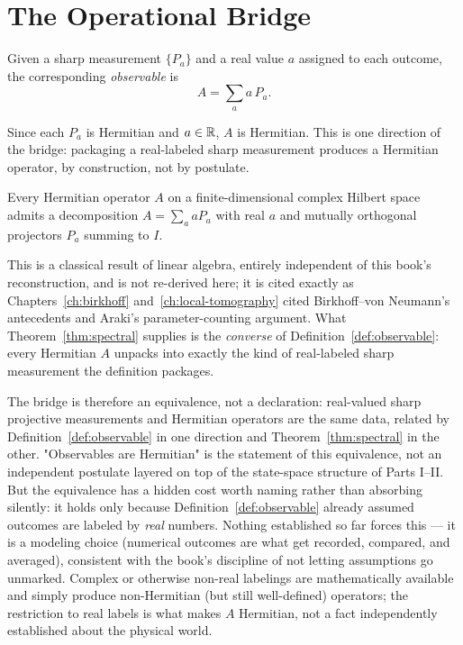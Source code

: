 \section{The Operational Bridge}

\begin{definition}[Observable]
\label{def:observable}
Given a sharp measurement $\{P_a\}$ and a real value $a$ assigned to each
outcome, the corresponding \emph{observable} is
\begin{equation}
A = \sum_a a\, P_a.
\end{equation}
\end{definition}

Since each $P_a$ is Hermitian and $a\in\mathbb{R}$, $A$ is Hermitian. This is one
direction of the bridge: packaging a real-labeled sharp measurement produces
a Hermitian operator, by construction, not by postulate.

\begin{theorem}
\label{thm:spectral}
Every Hermitian operator $A$ on a finite-dimensional complex Hilbert space
admits a decomposition $A = \sum_a a P_a$ with real $a$ and mutually
orthogonal projectors $P_a$ summing to $I$.
\end{theorem}

This is a classical result of linear algebra, entirely independent of this
book's reconstruction, and is not re-derived here; it is cited exactly as
Chapters~\ref{ch:birkhoff} and~\ref{ch:local-tomography} cited
Birkhoff--von Neumann's antecedents and Araki's parameter-counting argument.
What Theorem~\ref{thm:spectral} supplies is the \emph{converse} of
Definition~\ref{def:observable}: every Hermitian $A$ unpacks into exactly the
kind of real-labeled sharp measurement the definition packages.

\begin{remark}
\label{rem:real-labels-assumption}
The bridge is therefore an equivalence, not a declaration: real-valued sharp
projective measurements and Hermitian operators are the same data, related by
Definition~\ref{def:observable} in one direction and
Theorem~\ref{thm:spectral} in the other. "Observables are Hermitian" is the
statement of this equivalence, not an independent postulate layered on top of
the state-space structure of Parts I--II. But the equivalence has a hidden
cost worth naming rather than absorbing silently: it holds only because
Definition~\ref{def:observable} already assumed outcomes are labeled by
\emph{real} numbers. Nothing established so far forces this — it is a
modeling choice (numerical outcomes are what get recorded, compared, and
averaged), consistent with the book's discipline of not letting assumptions
go unmarked. Complex or otherwise non-real labelings are mathematically
available and simply produce non-Hermitian (but still well-defined)
operators; the restriction to real labels is what makes $A$ Hermitian, not a
fact independently established about the physical world.
\end{remark}

